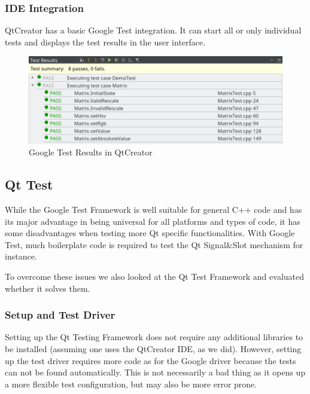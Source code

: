 \documentclass{scrreprt}
\begin{document}
\subsubsection{IDE Integration}

QtCreator has a basic Google Test integration. It can start all or only individual tests and displays the test results in the user interface.

\begin{figure}[h]
	\centering
	\includegraphics[width=1.0\textwidth]{img/qtcreator_test_results}
	\caption[QtCreator Google Test Results]{Google Test Results in QtCreator}
	\label{fig:qtcreator_test_results}
\end{figure}

\subsection{Qt Test}

While the Google Test Framework is well suitable for general C++ code and has its major advantage in being universal for all platforms and types of code, it has some disadvantages when testing more Qt specific functionalities. With Google Test, much boilerplate code is required to test the Qt Signal\&Slot mechanism for instance.

To overcome these issues we also looked at the Qt Test Framework and evaluated whether it solves them.

\subsubsection{Setup and Test Driver}

Setting up the Qt Testing Framework does not require any additional libraries to be installed (assuming one uses the QtCreator IDE, as we did). However, setting up the test driver requires more code as for the Google driver because the tests can not be found automatically. This is not necessarily a bad thing as it opens up a more flexible test configuration, but may also be more error prone.
\end{document}
